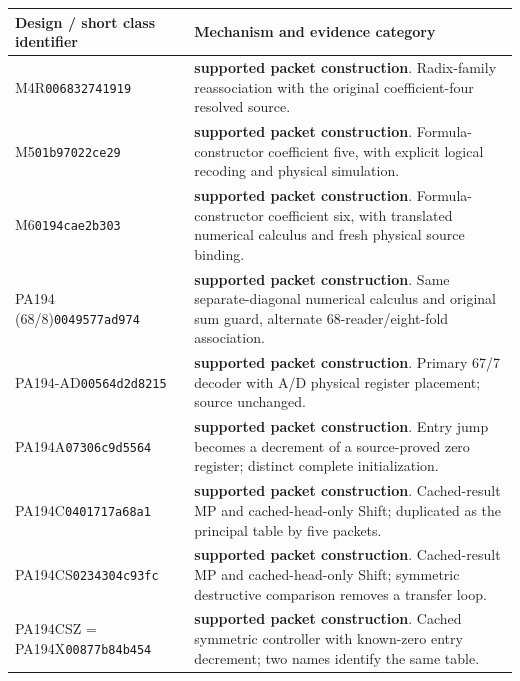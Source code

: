 \begingroup\footnotesize
\begin{longtable}{p{.28\linewidth}p{.64\linewidth}}
\toprule
Design / short class identifier & Mechanism and evidence category\\
\midrule\endhead
M4R\newline\texttt{006832741919} & \textbf{supported packet construction}. Radix-family reassociation with the original coefficient-four resolved source.\\[5pt]
M5\newline\texttt{01b97022ce29} & \textbf{supported packet construction}. Formula-constructor coefficient five, with explicit logical recoding and physical simulation.\\[5pt]
M6\newline\texttt{0194cae2b303} & \textbf{supported packet construction}. Formula-constructor coefficient six, with translated numerical calculus and fresh physical source binding.\\[5pt]
PA194 (68/8)\newline\texttt{0049577ad974} & \textbf{supported packet construction}. Same separate-diagonal numerical calculus and original sum guard, alternate 68-reader/eight-fold association.\\[5pt]
PA194-AD\newline\texttt{00564d2d8215} & \textbf{supported packet construction}. Primary 67/7 decoder with A/D physical register placement; source unchanged.\\[5pt]
PA194A\newline\texttt{07306c9d5564} & \textbf{supported packet construction}. Entry jump becomes a decrement of a source-proved zero register; distinct complete initialization.\\[5pt]
PA194C\newline\texttt{0401717a68a1} & \textbf{supported packet construction}. Cached-result MP and cached-head-only Shift; duplicated as the principal table by five packets.\\[5pt]
PA194CS\newline\texttt{0234304c93fc} & \textbf{supported packet construction}. Cached-result MP and cached-head-only Shift; symmetric destructive comparison removes a transfer loop.\\[5pt]
PA194CSZ = PA194X\newline\texttt{00877b84b454} & \textbf{supported packet construction}. Cached symmetric controller with known-zero entry decrement; two names identify the same table.\\[5pt]

\end{longtable}

